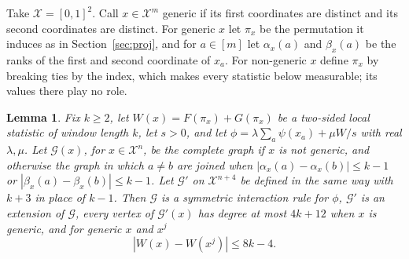 \documentclass[11pt]{amsart}
\newtheorem{lemma}[theorem]{Lemma}
\theoremstyle{remark}
\begin{document}
Take $\mathcal X=[0,1]^2$. Call $x\in\mathcal X^m$ generic if its first coordinates are distinct and its second
coordinates are distinct. For generic $x$ let $\pi_x$ be the permutation it induces as in Section~\ref{sec:proj}, and
for $a\in[m]$ let $\alpha_x(a)$ and $\beta_x(a)$ be the ranks of the first and second coordinate of $x_a$. For
non-generic $x$ define $\pi_x$ by breaking ties by the index, which makes every statistic below measurable; its values
there play no role.

\begin{lemma}\label{lem:graph}
Fix $k\ge2$, let $W(x)=F(\pi_x)+G(\pi_x)$ be a two-sided local statistic of window length $k$, let $s>0$, and let
$\phi=\lambda\sum_a\psi(x_a)+\mu W/s$ with real $\lambda,\mu$. Let $\mathcal G(x)$, for $x\in\mathcal X^n$, be the
complete graph if $x$ is not generic, and otherwise the graph in which $a\ne b$ are joined when
$|\alpha_x(a)-\alpha_x(b)|\le k-1$ or $|\beta_x(a)-\beta_x(b)|\le k-1$. Let $\mathcal G'$ on $\mathcal X^{n+4}$ be
defined in the same way with $k+3$ in place of $k-1$. Then $\mathcal G$ is a symmetric interaction rule for $\phi$,
$\mathcal G'$ is an extension of $\mathcal G$, every vertex of $\mathcal G'(x)$ has degree at most $4k+12$ when $x$ is
generic, and for generic $x$ and $x^j$
\[
|W(x)-W(x^j)|\le 8k-4.
\]
\end{lemma}
\end{document}
